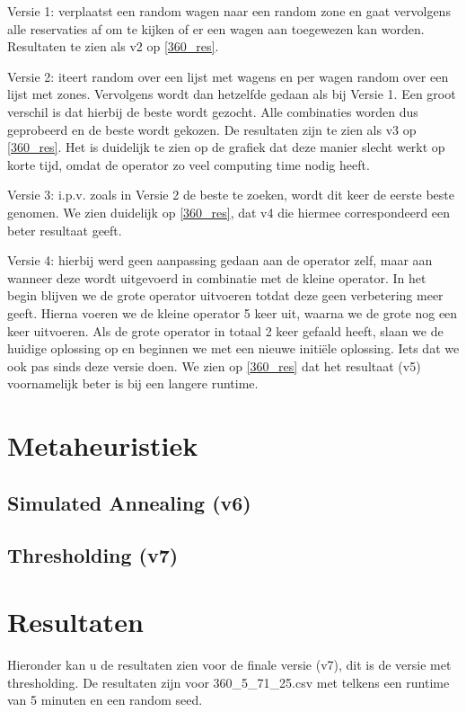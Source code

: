 \documentclass[a4paper, 12pt, one column]{article}
\begin{document}
Versie 1: verplaatst een random wagen naar een random zone en gaat vervolgens alle reservaties af om te kijken of er een wagen aan toegewezen kan worden. Resultaten te zien als v2 op \ref{360_res}.

Versie 2: iteert random over een lijst met wagens en per wagen random over een lijst met zones. Vervolgens wordt dan hetzelfde gedaan als bij Versie 1. Een groot verschil is dat hierbij de beste wordt gezocht. Alle combinaties worden dus geprobeerd en de beste wordt gekozen. De resultaten zijn te zien als v3 op \ref{360_res}. Het is duidelijk te zien op de grafiek dat deze manier slecht werkt op korte tijd, omdat de operator zo veel computing time nodig heeft.

Versie 3: i.p.v. zoals in Versie 2 de beste te zoeken, wordt dit keer de eerste beste genomen. We zien duidelijk op \ref{360_res}, dat v4 die hiermee correspondeerd een beter resultaat geeft.

Versie 4: hierbij werd geen aanpassing gedaan aan de operator zelf, maar aan wanneer deze wordt uitgevoerd in combinatie met de kleine operator. In het begin blijven we de grote operator uitvoeren totdat deze geen verbetering meer geeft. Hierna voeren we de kleine operator 5 keer uit, waarna we de grote nog een keer uitvoeren. Als de grote operator in totaal 2 keer gefaald heeft, slaan we de huidige oplossing op en beginnen we met een nieuwe initiële oplossing. Iets dat we ook pas sinds deze versie doen. We zien op \ref{360_res} dat het resultaat (v5) voornamelijk beter is bij een langere runtime.

\section{Metaheuristiek}
\subsection{Simulated Annealing (v6)}

\subsection{Thresholding (v7)}

\section{Resultaten}
Hieronder kan u de resultaten zien voor de finale versie (v7), dit is de versie met thresholding. De resultaten zijn voor 360\_5\_71\_25.csv met telkens een runtime van 5 minuten en een random seed.
\end{document}
